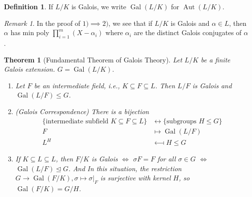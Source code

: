 \documentclass{article}
\theoremstyle{definition}
\newtheorem*{defn*}{Definition}
\theoremstyle{remark}
\newtheorem{rem}{Remark}
\theoremstyle{plain}
\newtheorem{thm}[defn]{Theorem}
\newcommand{\Aut}{\operatorname{Aut}}
\newcommand{\Gal}{\operatorname{Gal}}
\begin{document}
\begin{defn*}
    If $L/K$ is Galois, we write $\Gal(L/K)$ for $\Aut(L/K)$.
\end{defn*}
\begin{rem}
    In the proof of $1)\implies 2)$, we see that if $L/K$ is Galois and $\alpha\in L$, then $\alpha$ has min poly $\prod_{i=1}^m(X-\alpha_i)$ where $\alpha_i$ are the distinct Galois conjugates of $\alpha$.
\end{rem}
\begin{thm}[Fundamental Theorem of Galois Theory]
    Let $L/K$ be a finite Galois extension. $G=\Gal(L/K)$.
    \begin{enumerate}
        \item Let $F$ be an intermediate field, i.e., $K\subseteq F\subseteq L$. Then $L/F$ is Galois and $\Gal(L/F)\le G$.
        \item (Galois Correspondence) There is a bijection 
        \begin{align*}
            \{\text{intermediate subfield }K\subseteq F\subseteq L\}&\longleftrightarrow\{\text{subgroups } H\le G\}\\
            F&\longmapsto\Gal(L/F)\\
            L^H&\longmapsfrom H\le G
        \end{align*}
        \item If $K\subseteq L\subseteq L$, then $F/K$ is Galois $\Leftrightarrow$ $\sigma F=F$ for all $\sigma\in G$ $\Leftrightarrow$ $\Gal(L/F)\trianglelefteq G$. And In this situation, the restriction $G\to \Gal(F/K), \sigma\mapsto \sigma|_F$ is surjective with kernel $H$, so $\Gal(F/K)=G/H$.
    \end{enumerate}
\end{thm}
\end{document}
